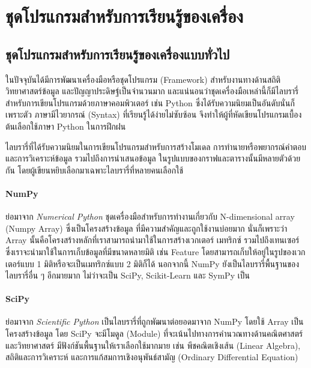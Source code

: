 

\section{ชุดโปรแกรมสำหรับการเรียนรู้ของเครื่อง}
\label{ap:library_ml}

\subsection{ชุดโปรแกรมสำหรับการเรียนรู้ของเครื่องแบบทั่วไป}

ในปัจจุบันได้มีการพัฒนาเครื่องมือหรือชุดโปรแกรม (Framework) สำหรับงานทางด้านสถิติ วิทยาศาสตร์ข้อมูล และปัญญาประดิษฐ์เป็นจำนวนมาก
และแน่นอนว่าชุดเครื่องมือเหล่านี้ก็มีไลบรารี่สำหรับการเขียนโปรแกรมด้วยภาษาคอมพิวเตอร์ เช่น Python ซึ่งได้รับความนิยมเป็นอันดับนั่นก็เพราะตัว%
ภาษามีไวยากรณ์ (Syntax) ที่เรียนรู้ได้ง่ายไม่ซับซ้อน จึงทำให้ผู้ที่หัดเขียนโปรแกรมเบื้องต้นเลือกใช้ภาษา Python ในการฝึกฝน 

ไลบรารี่ที่ได้รับความนิยมในการเขียนโปรแกรมสำหรับการสร้างโมเดล การทำนายหรือพยากรณ์คำตอบ และการวิเคราะห์ข้อมูล รวมไปถึงการนำเสนอข้อมูล%
ในรูปแบบของกราฟและตารางนั้นมีหลายตัวด้วยกัน โดยผู้เขียนหยิบเลือกมาเฉพาะไลบรารี่ที่หลายคนเลือกใช้

\paragraph{\textbf{NumPy}}
ย่อมาจาก \textit{Numerical Python} ชุดเครื่องมือสำหรับการทำงานเกี่ยวกับ N-dimensional array (Numpy Array) ซึ่งเป็นโครงสร้างข้อมูล%
ที่มีความสำคัญและถูกใช้งานบ่อยมาก นั่นก็เพราะว่า Array นั้นคือโครงสร้างหลักที่เราสามารถนำมาใช้ในการสร้างเวกเตอร์ เมทริกซ์ รวมไปถึงเทนเซอร์
ซึ่งเราจะนำมาใช้ในการเก็บข้อมูลที่มีขนาดหลายมิติ เช่น Feature โดยสามารถเก็บให้อยู่ในรูปของเวกเตอร์แบบ 1 มิติหรือจะเป็นเมทริกซ์แบบ 2 มิติก็ได้
นอกจากนี้ NumPy ยังเป็นไลบรารี่พื้นฐานของไลบรารี่อื่น ๆ อีกมายมาก ไม่ว่าจะเป็น SciPy, Scikit-Learn และ SymPy เป็น

\paragraph{SciPy} 
ย่อมาจาก \textit{Scientific Python} เป็นไลบรารี่ที่ถูกพัฒนาต่อยอดมาจาก NumPy โดยใช้ Array เป็นโครงสร้างข้อมูล
โดย SciPy จะมีโมดูล (Module) ที่จะเน้นไปทางการคำนวณทางด้านคณิตศาสตร์และวิทยาศาสตร์ มีฟังก์ชันพื้นฐานให้เราเลือกใช้มากมาย เช่น 
พีชคณิตเชิงเส้น (Linear Algebra), สถิติและการวิเคราะห์ และการแก้สมการเชิงอนุพันธ์สามัญ (Ordinary Differential Equation)

